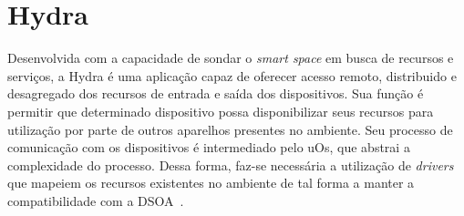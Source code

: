 \section{Hydra}
\label{sec:Hydra}

Desenvolvida com a capacidade de sondar o \emph{smart space} em busca de recursos e serviços, a Hydra é uma aplicação capaz de oferecer acesso remoto, distribuido e desagregado dos recursos de entrada e saída dos dispositivos. Sua função é permitir que determinado dispositivo possa disponibilizar seus recursos para utilização por parte de outros aparelhos presentes no ambiente. Seu processo de comunicação com os dispositivos é intermediado pelo uOs, que abstrai a complexidade do processo. Dessa forma, faz-se necessária a utilização de \emph{drivers} que mapeiem os recursos existentes no ambiente de tal forma a manter a compatibilidade com a DSOA~\cite{buzeto2010, lucas2011}.

\begin{comment}
A Hydra consiste em uma aplicação construída com o objetivo de explorar a forma como o ambiente é decomposto em recursos e serviços para possibilitar uma forma desagregada de acesso a recursos de entrada e saída dos dispositivos. Seu objetivo é permitir que um determinado dispositivo tenha seus recursos de entrada e saída redirecionados para outros dispositivos, repassando a estes o controle de sua operação.

A Hydra, trabalhando sobre o middleware uOS, percebe o ambiente como um conjunto
de recursos presentes. A comunicação entre a Hydra os recursos ocorre com intermédio do
uOS, abstraindo tanto da Hydra quando dos drivers o outro ponto de comunicação. Para
os drivers, não importa para quem estão sendo prestados os serviços, e cabe à aplicação
a escolha entre os recursos do ambiente.

Por trabalhar com os conceitos da DSOA (Seção 3.1), a Hydra vê os recursos do
ambiente de forma transparente, e pode fazer uso de qualquer recurso compatível com as
interfaces por ele esperadas e permite que outros dispositivos utilizem os mesmos recursos
do ambiente.

A aplicação Hydra se propõe a reconhecer determinados drivers e redirecionar seus
serviços corretamente.
\end{comment}